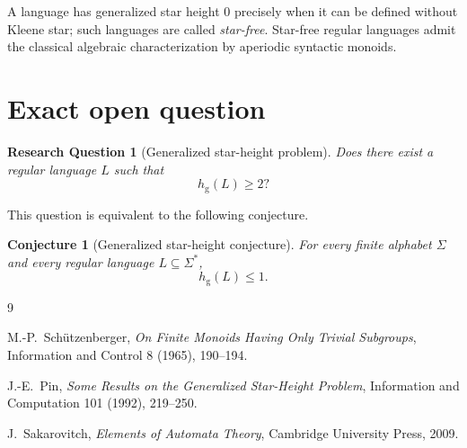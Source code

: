 \documentclass[11pt]{article}
\newtheorem{conjecture}{Conjecture}
\newtheorem{question}{Research Question}
\begin{document}
A language has generalized star height $0$ precisely when it can be defined
without Kleene star; such languages are called \emph{star-free}.  Star-free
regular languages admit the classical algebraic characterization by
aperiodic syntactic monoids.

\section{Exact open question}

\begin{question}[Generalized star-height problem]
Does there exist a regular language $L$ such that
\[
  h_{\mathrm g}(L)\geq2?
\]
\end{question}

This question is equivalent to the following conjecture.

\begin{conjecture}[Generalized star-height conjecture]
For every finite alphabet $\Sigma$ and every regular language
$L\subseteq\Sigma^*$,
\[
  h_{\mathrm g}(L)\leq1.
\]
\end{conjecture}


\begin{thebibliography}{9}

M.-P.~Sch\"utzenberger,
\emph{On Finite Monoids Having Only Trivial Subgroups},
Information and Control 8 (1965), 190--194.

J.-E.~Pin,
\emph{Some Results on the Generalized Star-Height Problem},
Information and Computation 101 (1992), 219--250.

J.~Sakarovitch,
\emph{Elements of Automata Theory},
Cambridge University Press, 2009.

\end{thebibliography}
\end{document}
